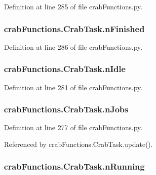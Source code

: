 Definition at line 285 of file crab\-Functions.\-py.

\subsubsection[{n\-Finished}]{\setlength{\rightskip}{0pt plus 5cm}crab\-Functions.\-Crab\-Task.\-n\-Finished}\label{classcrabFunctions_1_1CrabTask_a07d947089d0cebe911f7b7d6b6f985de}


Definition at line 286 of file crab\-Functions.\-py.

\subsubsection[{n\-Idle}]{\setlength{\rightskip}{0pt plus 5cm}crab\-Functions.\-Crab\-Task.\-n\-Idle}\label{classcrabFunctions_1_1CrabTask_ac9500df5154af29230bf46b70c8b972e}


Definition at line 281 of file crab\-Functions.\-py.

\subsubsection[{n\-Jobs}]{\setlength{\rightskip}{0pt plus 5cm}crab\-Functions.\-Crab\-Task.\-n\-Jobs}\label{classcrabFunctions_1_1CrabTask_a4624f348accb397ec35cd39b4c0a92c3}


Definition at line 277 of file crab\-Functions.\-py.



Referenced by crab\-Functions.\-Crab\-Task.\-update().

\subsubsection[{n\-Running}]{\setlength{\rightskip}{0pt plus 5cm}crab\-Functions.\-Crab\-Task.\-n\-Running}\label{classcrabFunctions_1_1CrabTask_ac9d85013f7112716fcba03f32537ba28}


